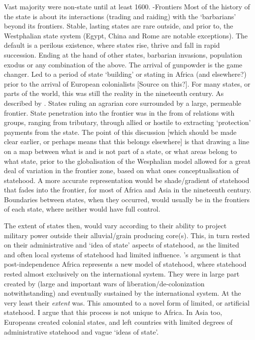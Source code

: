 \documentclass[12pt]{article}
\begin{document}
Vast majority were non-state until at least 1600. -Frontiers Most of the history
of the state is about its interactions (trading and raiding) with the
`barbarians' beyond its frontiers. Stable, lasting states are rare outside, and
prior to, the Westphalian state system (Egypt, China and Rome are notable
exceptions). The default is a perilous existence, where states rise, thrive and
fall in rapid succession. Ending at the hand of other states, barbarian
invasions, population exodus or any combination of the above. The arrival of
gunpowder is the game changer. Led to a period of state `building' or stating in
Africa (and elsewhere?) prior to the arrival of European colonialists [Source on
this?]. For many states, or parts of the world, this was still the reality in
the nineteenth century. As described by	\citet{Scott2009}. States ruling an
agrarian core surrounded by a large, permeable frontier. State penetration into
the frontier was in the from of relations with groups, ranging from tributary,
through allied or hostile to extracting `protection' payments from the state.
The point of this discussion [which should be made clear earlier, or perhaps
means that this belongs elsewhere] is that drawing a line on a map between what
is and is not part of a state, or what areas belong to what state, prior to the
globalisation of the Wesphalian model allowed for a great deal of variation in
the frontier zone, based on what ones conceptualisation of statehood. A more
accurate representation would be shade/gradient of statehood that fades into the
frontier, for most of Africa and Asia in the nineteenth century. Boundaries
between states, when they occurred, would usually be in the frontiers of each
state, where neither would have full control.

The extent of states then, would vary according to their ability to project
military power outside their alluvial/grain producing core(s). This, in turn
rested on their administrative and `idea of state' aspects of statehood, as the
limited and often local systems of statehood had limited influence.
\citet{Clapham1996}'s argument is that post-independence Africa represents a new
model of statehood, where statehood rested almost exclusively on the
international system. They were in large part created by (large and important
wars of liberation/de-colonization notwithstanding) and eventually sustained by
the international system. At the very least their \textit{extent} was. This
amounted to a novel form of limited, or artificial statehood. I argue that this
process is not unique to Africa. In Asia too, Europeans created colonial states,
and left countries with limited degrees of administrative statehood and vague
`ideas of state'.
\end{document}
